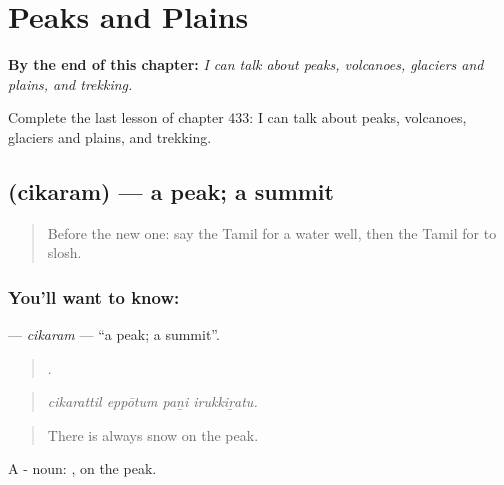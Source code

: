 
\chapter{Peaks and Plains}
\label{ch:ta-peaks-and-plains}

\begin{chapteropening}
\textbf{By the end of this chapter:} \emph{I can talk about peaks, volcanoes, glaciers and plains, and trekking.}

Complete the last lesson of chapter 433: I can talk about peaks, volcanoes, glaciers and plains, and trekking.
\end{chapteropening}

\section[\texorpdfstring{\ta{சிகரம்} (cikaram)}{சிகரம் (cikaram)}]{ (cikaram) — a peak; a summit}

\label{lesson:TA-C433-cikaram}



\begin{quote}
Before the new one: say the Tamil for a water well, then the Tamil for to slosh.
\end{quote}

\subsection*{You'll want to know: }
\textbf{} — \emph{cikaram} — \textquotedblleft{}a peak; a summit\textquotedblright{}.

\begin{quote}
   .
\end{quote}

\begin{quote}
\emph{cikarattil eppōtum paṉi irukkiṟatu.}
\end{quote}

\begin{quote}
There is always snow on the peak.
\end{quote}

A - noun: , on the peak.

